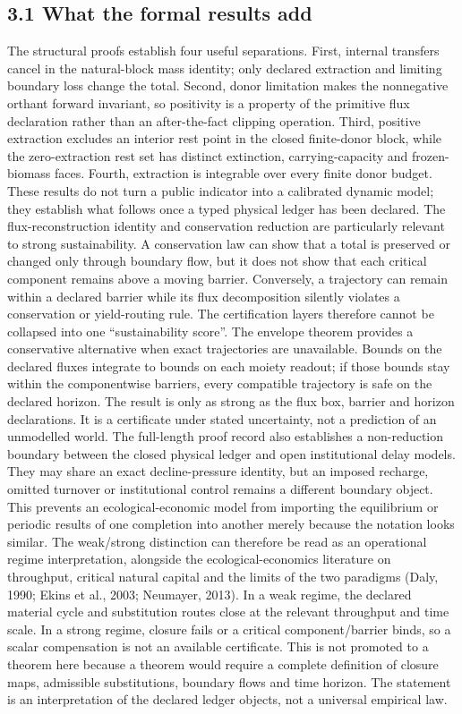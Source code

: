 \documentclass[11pt]{article}
\begin{document}
\subsection{3.1 What the formal results add}
The structural proofs establish four useful separations. First, internal transfers cancel in the natural-block mass identity; only declared extraction and limiting boundary loss change the total. Second, donor limitation makes the nonnegative orthant forward invariant, so positivity is a property of the primitive flux declaration rather than an after-the-fact clipping operation. Third, positive extraction excludes an interior rest point in the closed finite-donor block, while the zero-extraction rest set has distinct extinction, carrying-capacity and frozen-biomass faces. Fourth, extraction is integrable over every finite donor budget. These results do not turn a public indicator into a calibrated dynamic model; they establish what follows once a typed physical ledger has been declared.
The flux-reconstruction identity and conservation reduction are particularly relevant to strong sustainability. A conservation law can show that a total is preserved or changed only through boundary flow, but it does not show that each critical component remains above a moving barrier. Conversely, a trajectory can remain within a declared barrier while its flux decomposition silently violates a conservation or yield-routing rule. The certification layers therefore cannot be collapsed into one ``sustainability score''.
The envelope theorem provides a conservative alternative when exact trajectories are unavailable. Bounds on the declared fluxes integrate to bounds on each moiety readout; if those bounds stay within the componentwise barriers, every compatible trajectory is safe on the declared horizon. The result is only as strong as the flux box, barrier and horizon declarations. It is a certificate under stated uncertainty, not a prediction of an unmodelled world.
The full-length proof record also establishes a non-reduction boundary between the closed physical ledger and open institutional delay models. They may share an exact decline-pressure identity, but an imposed recharge, omitted turnover or institutional control remains a different boundary object. This prevents an ecological-economic model from importing the equilibrium or periodic results of one completion into another merely because the notation looks similar.
The weak/strong distinction can therefore be read as an operational regime interpretation, alongside the ecological-economics literature on throughput, critical natural capital and the limits of the two paradigms (Daly, 1990; Ekins et al., 2003; Neumayer, 2013). In a weak regime, the declared material cycle and substitution routes close at the relevant throughput and time scale. In a strong regime, closure fails or a critical component/barrier binds, so a scalar compensation is not an available certificate. This is not promoted to a theorem here because a theorem would require a complete definition of closure maps, admissible substitutions, boundary flows and time horizon. The statement is an interpretation of the declared ledger objects, not a universal empirical law.
\end{document}
